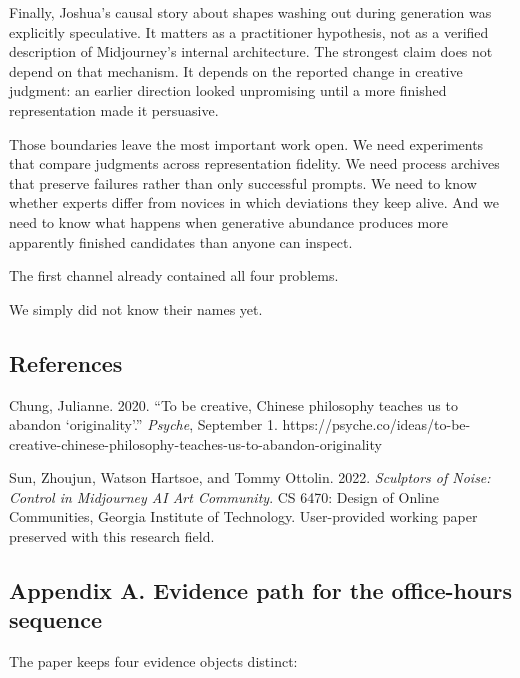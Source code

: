 \documentclass[
]{article}
\begin{document}
Finally, Joshua's causal story about shapes washing out during
generation was explicitly speculative. It matters as a practitioner
hypothesis, not as a verified description of Midjourney's internal
architecture. The strongest claim does not depend on that mechanism. It
depends on the reported change in creative judgment: an earlier
direction looked unpromising until a more finished representation made
it persuasive.

Those boundaries leave the most important work open. We need experiments
that compare judgments across representation fidelity. We need process
archives that preserve failures rather than only successful prompts. We
need to know whether experts differ from novices in which deviations
they keep alive. And we need to know what happens when generative
abundance produces more apparently finished candidates than anyone can
inspect.

The first channel already contained all four problems.

We simply did not know their names yet.

\subsection{References}\label{references}

Chung, Julianne. 2020. ``To be creative, Chinese philosophy teaches us
to abandon `originality'.'' \emph{Psyche}, September 1.
https://psyche.co/ideas/to-be-creative-chinese-philosophy-teaches-us-to-abandon-originality

Sun, Zhoujun, Watson Hartsoe, and Tommy Ottolin. 2022. \emph{Sculptors
of Noise: Control in Midjourney AI Art Community}. CS 6470: Design of
Online Communities, Georgia Institute of Technology. User-provided
working paper preserved with this research field.

\subsection{Appendix A. Evidence path for the office-hours
sequence}\label{appendix-a.-evidence-path-for-the-office-hours-sequence}

The paper keeps four evidence objects distinct:
\end{document}
